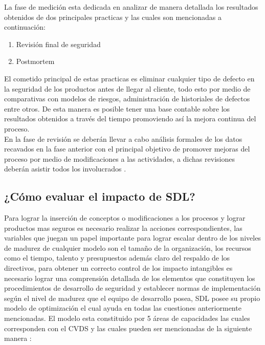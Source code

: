 \documentclass[runningheads,a4paper]{llncs}
\begin{document}
La fase de medición esta dedicada en analizar de manera detallada los resultados obtenidos de dos principales practicas y las cuales son mencionadas a continuación:

\begin{enumerate}
\item Revisión final de seguridad 
\item Postmortem 
\end{enumerate}

El cometido principal de estas practicas es eliminar cualquier tipo de defecto en la seguridad de los productos antes de llegar al cliente, todo esto por medio de comparativas con modelos de riesgos, administración de historiales de defectos entre otros. De esta manera es posible tener una base contable sobre los resultados obtenidos a través del tiempo promoviendo así la mejora continua del proceso. \\

En la fase de revisión se deberán llevar a cabo análisis formales de los datos recavados en la fase anterior con el principal objetivo de promover mejoras del proceso por medio de modificaciones a las actividades, a dichas revisiones deberán asistir todos los involucrados \cite{SDLWhitePaper}. 

\subsection{¿Cómo evaluar el impacto de \gls{SDL}?}

Para lograr la inserción de conceptos o modificaciones a los procesos y lograr productos mas seguros es necesario realizar la acciones correspondientes, las variables que juegan un papel importante para lograr escalar dentro de los niveles de madurez de cualquier modelo son el tamaño de la organización, los recursos como el tiempo, talento y presupuestos además claro del respaldo de los directivos,  para obtener un correcto control de los impacto intangibles es necesario lograr una comprensión detallada de los elementos que constituyen los procedimientos de desarrollo de seguridad y establecer normas de implementación según el nivel de madurez que el equipo de desarrollo posea, \gls{SDL} posee su propio modelo de optimización el cual ayuda en todas las cuestiones anteriormente mencionadas. El modelo esta constituido por 5 áreas de capacidades las cuales corresponden con el \gls{CVDS} y las cuales pueden ser  mencionadas de la siguiente manera \cite{SDLSecurityDevelopmentLifecicle}: 
\end{document}
